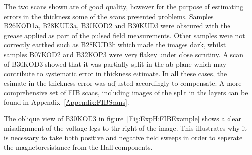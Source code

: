 The two scans shown are of good quality, however for the purpose of estimating errors in the thickness some of the scans presented problems. Samples B26KOD1a, B28KUD3a, B30KOD2 and B30KUD3 were obscured with the grease applied as part of the pulsed field measurements. Other samples were not correctly earthed such as B28KUD3b which made the images dark, whilst samples B07KOD2 and B32KOP3 were very flakey under close scrutiny. A scan of B30KOD3 showed that it was partially split in the ab plane which may contribute to systematic error in thickness estimate. In all these cases, the esimate in the thickness error was adjusted accordingly to compensate. A more comprehensive set of \ac{FIB} scans, including images of the split in the layers can be found in Appendix~\ref{Appendix:FIBScans}.

The oblique view of B30KOD3 in figure~\ref{Fig:ExpH:FIBExample} shows a clear misalignment of the voltage legs to thr right of the image. This illustrates why it is necessary to take both positive and negative field sweeps in order to seperate the magnetoresistance from the Hall components.

